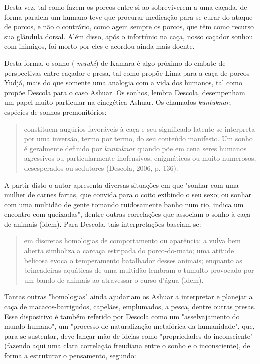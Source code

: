 Desta vez, tal como fazem os porcos entre si ao sobreviverem a uma
caçada, de forma paralela um humano teve que procurar medicação para se
curar do ataque de porcos, e não o contrário, como agem sempre os
porcos, que têm como recurso sua glândula dorsal. Além disso, após o
infortúnio na caça, nosso caçador sonhou com inimigos, foi morto por
eles e acordou ainda mais doente.

Desta forma, o sonho (-\emph{muuhi}) de Kamara é algo próximo do embate
de perspectivas entre caçador e presa, tal como propõe Lima para a caça
de porcos Yudjá, mais do que somente uma analogia com a vida dos
humanos, tal como propõe Descola para o caso Ashuar. Os sonhos, lembra
Descola, desempenham um papel muito particular na cinegética Ashuar. Os
chamados \emph{kuntuknar}, espécies de sonhos premonitórios:

\begin{quote}
constituem augúrios favoráveis à caça e seu significado latente se
interpreta por uma inversão, termo por termo, do seu conteúdo manifesto.
Um sonho é geralmente definido por \emph{kuntuknar} quando põe em cena
seres humanos agressivos ou particularmente inofensivos, enigmáticos ou
muito numerosos, desesperados ou sedutores (Descola, 2006, p. 136).
\end{quote}

A partir disto o autor apresenta diversas situações em que "sonhar com
uma mulher de carnes fartas, que convida para o coito exibindo o seu
sexo; ou sonhar com uma multidão de gente tomando ruidosamente banho num
rio, indica um encontro com queixadas", dentre outras correlações que
associam o sonho à caça de animais (idem). Para Descola, tais
interpretações baseiam-se:

\begin{quote}
em discretas homologias de comportamento ou aparência: a vulva bem
aberta simboliza a carcaça estripada do porco-do-mato; uma atitude
belicosa evoca o temperamento batalhador desses animais; enquanto as
brincadeiras aquáticas de uma multidão lembram o tumulto provocado por
um bando de animais ao atravessar o curso d'água (idem).
\end{quote}

Tantas outras "homologias" ainda ajudariam os Ashuar a interpretar e
planejar a caça de macacos-barrigudos, capelães, emplumados, a pesca,
dentre outras presas. Esse dispositivo é também referido por Descola
como um "asselvajamento do mundo humano", um "processo de naturalização
metafórica da humanidade", que, para se sustentar, deve lançar mão de
ideias como "propriedades do inconsciente" (fazendo aqui uma clara
correlação freudiana entre o sonho e o inconsciente), de forma a
estruturar o pensamento, segundo:

